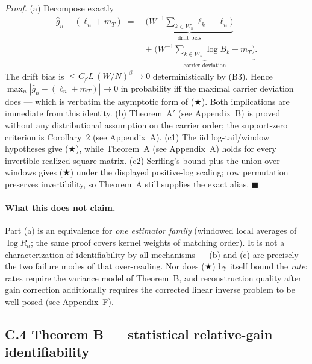 \noindent\emph{Proof.} (a) Decompose exactly
\begin{align*}
\hat g_n-(\ell_n+m_T)\;=\;&\underbrace{\Big(W^{-1}\!\!\sum_{k\in W_n}\ell_k-\ell_n\Big)}_{\text{drift bias}}\\
&+\;\underbrace{\Big(W^{-1}\!\!\sum_{k\in W_n}\log B_k-m_T\Big)}_{\text{carrier deviation}} .
\end{align*}
The drift bias is $\le C_\beta L\,(W/N)^\beta\to0$ deterministically by (B3). Hence $\max_n|\hat g_n-(\ell_n+m_T)|\to0$ in probability iff the maximal carrier deviation does --- which is verbatim the asymptotic form of ($\bigstar$). Both implications are immediate from this identity. (b) Theorem~A$'$ (see Appendix~B) is proved without any distributional assumption on the carrier order; the support-zero criterion is Corollary~2 (see Appendix~A). (c1) The iid log-tail/window hypotheses give ($\bigstar$), while Theorem~A (see Appendix~A) holds for every invertible realized square matrix. (c2) Serfling's bound plus the union over windows gives ($\bigstar$) under the displayed positive-log scaling; row permutation preserves invertibility, so Theorem~A still supplies the exact alias. \hfill$\blacksquare$

\paragraph{What this does not claim.} Part (a) is an equivalence for \emph{one estimator family} (windowed local averages of $\log R_n$; the same proof covers kernel weights of matching order). It is not a characterization of identifiability by all mechanisms --- (b) and (c) are precisely the two failure modes of that over-reading. Nor does ($\bigstar$) by itself bound the \emph{rate}: rates require the variance model of Theorem~B, and reconstruction quality after gain correction additionally requires the corrected linear inverse problem to be well posed (see Appendix~F).

\subsection{C.4 Theorem B --- statistical relative-gain identifiability}

